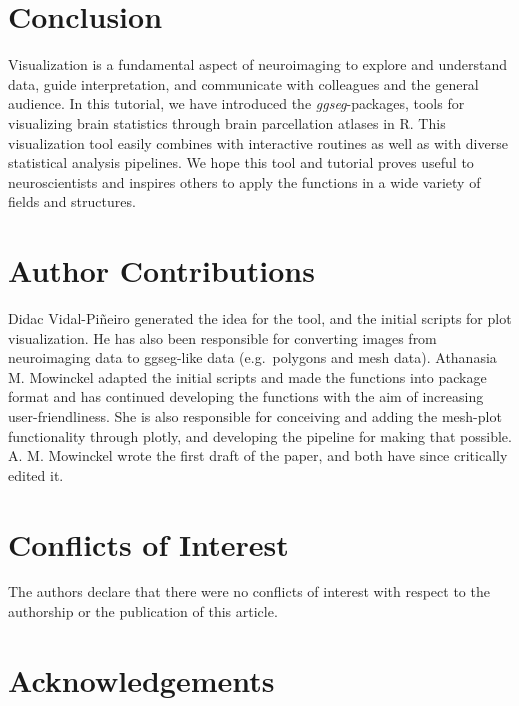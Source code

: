 \documentclass[fleqn,10pt]{wlpeerj} %
\begin{document}
\hypertarget{conclusion}{%
\section{Conclusion}\label{conclusion}}

Visualization is a fundamental aspect of neuroimaging to explore and understand data, guide interpretation, and communicate with colleagues and the general audience.
In this tutorial, we have introduced the \emph{ggseg}-packages, tools for visualizing brain statistics through brain parcellation atlases in R.
This visualization tool easily combines with interactive routines as well as with diverse statistical analysis pipelines.
We hope this tool and tutorial proves useful to neuroscientists and inspires others to apply the functions in a wide variety of fields and structures.

\hypertarget{author-contributions}{%
\section{Author Contributions}\label{author-contributions}}

Didac Vidal-Piñeiro generated the idea for the tool, and the initial scripts for plot visualization.
He has also been responsible for converting images from neuroimaging data to ggseg-like data (e.g.~polygons and mesh data).
Athanasia M. Mowinckel adapted the initial scripts and made the functions into package format and has continued developing the functions with the aim of increasing user-friendliness.
She is also responsible for conceiving and adding the mesh-plot functionality through plotly, and developing the pipeline for making that possible.
A. M. Mowinckel wrote the first draft of the paper, and both have since critically edited it.

\hypertarget{conflicts-of-interest}{%
\section{Conflicts of Interest}\label{conflicts-of-interest}}

The authors declare that there were no conflicts of interest with respect to the authorship or the publication of this article.

\hypertarget{acknowledgements}{%
\section{Acknowledgements}\label{acknowledgements}}
\end{document}
